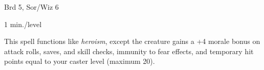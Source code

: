 
\begin{description*}
\item[Level:] Brd 5, Sor/Wiz 6
\item[Duration:] 1 min./level
\end{description*}

This spell functions like \textit{heroism}, except the creature gains a +4 morale
bonus on attack rolls, saves, and skill checks, immunity to fear effects, and temporary
hit points equal to your caster level (maximum 20).